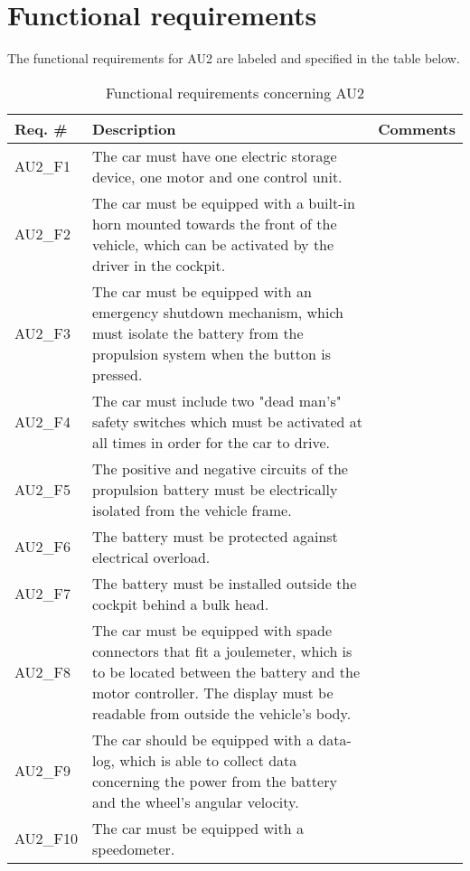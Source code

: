 \section{Functional requirements}
The functional requirements for AU2 are labeled and specified in the table below.

\begin{table}[h!]
	\label{FREQ_AU2}
	\centering
	\begin{tabular}{|p{2 cm}|p{7 cm}|p{4 cm}|}
		\hline
		\textbf{Req. \#} & \textbf{Description} & \textbf{Comments} \\\hline
		AU2\_F1		& The car must have one electric storage device, one motor and one control unit. &   \\\hline
		AU2\_F2		& The car must be equipped with a built-in horn mounted towards the front of the vehicle, which can be activated by the driver in the cockpit. &   \\\hline
		AU2\_F3		& The car must be equipped with an emergency shutdown mechanism, which must isolate the battery from the propulsion system when the button is pressed. &   \\\hline
		AU2\_F4		& The car must include two "dead man's" safety switches which must be activated at all times in order for the car to drive. &   \\\hline
		AU2\_F5	& The positive and negative circuits of the propulsion battery  must be electrically isolated from the vehicle frame. &   \\\hline
		AU2\_F6	& 
		The battery must be protected against electrical overload. &   \\\hline
		AU2\_F7		& The battery must be installed outside the cockpit behind a bulk head. &   \\\hline
		AU2\_F8	& The car must be equipped with spade connectors that fit a joulemeter, which is to be located between the battery and the motor controller. The display must be readable from outside the vehicle's body. &   \\\hline
		AU2\_F9	& The car should be equipped with a data-log, which is able to collect data concerning the power from the battery and the wheel's angular velocity. &   \\\hline
		AU2\_F10	& The car must be equipped with a speedometer. &   \\\hline
	\end{tabular}
	\caption{Functional requirements concerning AU2}
\end{table}


